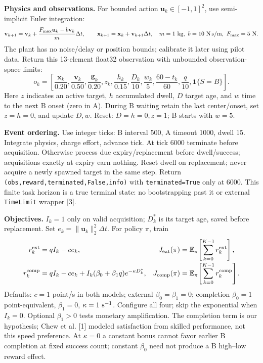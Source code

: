 \documentclass[10pt,letterpaper]{article}
\begin{document}
\textbf{Physics and observations.} For bounded action $\mathbf u_k\in[-1,1]^2$, use semi-implicit Euler integration:
\[
\mathbf v_{k+1}=\mathbf v_k+\frac{F_{\max}\mathbf u_k-b\mathbf v_k}{m}\Delta t,
\qquad \mathbf x_{k+1}=\mathbf x_k+\mathbf v_{k+1}\Delta t,
\quad m=1\text{ kg},\ b=10\text{ N\,s/m},\ F_{\max}=5\text{ N}.
\]
The plant has no noise/delay or position bounds; calibrate it later using pilot data. Return this 13-element float32 observation with unbounded observation-space limits:
\[
o_k=\left[\frac{\mathbf x_k}{0.20},\frac{\mathbf v_k}{0.50},
\frac{\mathbf g_k}{0.20},z_k,\frac{h_k}{0.15},\frac{D_k}{10},
\frac{w_k}{5},\frac{60-t_k}{60},\frac q{10},\mathbf 1\{S=B\}\right].
\]
Here $z$ indicates an active target, $h$ accumulated dwell, $D$ target age, and $w$ time to the next B onset (zero in A). During B waiting retain the last center/onset, set $z=h=0$, and update $D,w$. Reset: $D=h=0,z=1$; B starts with $w=5$.

\textbf{Event ordering.} Use integer ticks: B interval 500, A timeout 1000, dwell 15. Integrate physics, charge effort, advance tick. At tick 6000 terminate before acquisition. Otherwise process due expiry/replacement before dwell/success; acquisitions exactly at expiry earn nothing. Reset dwell on replacement; never acquire a newly spawned target in the same step. Return \texttt{(obs,reward,terminated,False,info)} with \texttt{terminated=True} only at 6000. This finite task horizon is a true terminal state: no bootstrapping past it or external \texttt{TimeLimit} wrapper [3].

\textbf{Objectives.} $I_k=1$ only on valid acquisition; $D_k^*$ is its target age, saved before replacement. Set $e_k=\|\mathbf u_k\|_2^2\Delta t$. For policy $\pi$, train
\begin{align*}
r_k^{\rm ext}&=q I_k-c e_k, &
J_{\rm ext}(\pi)&=\mathbb E_\pi\!\left[\sum_{k=0}^{K-1}r_k^{\rm ext}\right],\\[-2pt]
r_k^{\rm comp}&=q I_k-c e_k+I_k(\beta_0+\beta_1q)e^{-\kappa D_k^*}, &
J_{\rm comp}(\pi)&=\mathbb E_\pi\!\left[\sum_{k=0}^{K-1}r_k^{\rm comp}\right].
\end{align*}
Defaults: $c=1$ point/s in both models; external $\beta_0=\beta_1=0$; completion $\beta_0=1$ point-equivalent, $\beta_1=0$, $\kappa=1\ {\rm s}^{-1}$. Configure all four; skip the exponential when $I_k=0$. Optional $\beta_1>0$ tests monetary amplification. The completion term is our hypothesis; Chew et al. [1] modeled satisfaction from skilled performance, not this speed preference. At $\kappa=0$ a constant bonus cannot favor earlier B completion at fixed success count; constant $\beta_0$ need not produce a B high--low reward effect.
\end{document}
